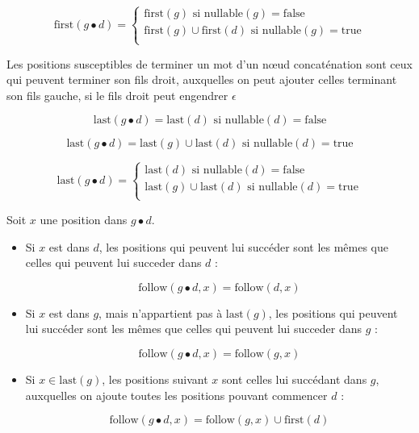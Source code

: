 \documentclass{article}
\begin{document}
$$\mbox{first}(g\bullet d)=\left\{
\begin{array}{l}
\mbox{first}(g) \mbox{ si } \mbox{nullable}(g)= \mbox{false} \\
\mbox{first}(g)\cup \mbox{first}(d) \mbox{ si } \mbox{nullable}(g)=\mbox{true}\\
\end{array}
\right.
$$





Les positions susceptibles de terminer un mot d'un n\oe ud concaténation sont ceux qui peuvent terminer son fils droit, auxquelles on peut ajouter celles terminant son fils gauche, si le fils droit peut engendrer $\epsilon$

$$\mbox{last}(g\bullet d)=\mbox{last}(d) \mbox{ si } \mbox{nullable}(d)= \mbox{false}$$

$$\mbox{last}(g\bullet d)=\mbox{last}(g)\cup \mbox{last}(d) \mbox{ si } \mbox{nullable}(d)=\mbox{true}$$

$$\mbox{last}(g\bullet d)=\left\{
\begin{array}{l}
\mbox{last}(d) \mbox{ si } \mbox{nullable}(d)= \mbox{false}\\
\mbox{last}(g)\cup \mbox{last}(d) \mbox{ si } \mbox{nullable}(d)=\mbox{true}\\
\end{array}
\right.
$$

Soit $x$ une position dans $g\bullet d$. 
\begin{itemize}
\item Si $x$ est dans $d$, les positions qui peuvent lui succéder sont les mêmes que celles qui peuvent lui succeder dans $d$ : 

$$\mbox{follow}(g\bullet d,x)=\mbox{follow}(d,x)$$

\item Si $x$ est dans $g$, mais n'appartient pas à $\mbox{last}(g)$, les positions qui peuvent lui succéder sont les mêmes que celles qui peuvent lui succeder dans $g$ : 

$$\mbox{follow}(g\bullet d,x)=\mbox{follow}(g,x)$$

\item Si $x \in \mbox{last}(g)$, les positions suivant $x$ sont celles lui succédant dans $g$, auxquelles on ajoute toutes les positions pouvant commencer $d$ : 

$$\mbox{follow}(g\bullet d,x)=\mbox{follow}(g,x) \cup \mbox{first}(d)$$

\end{itemize}
\end{document}
